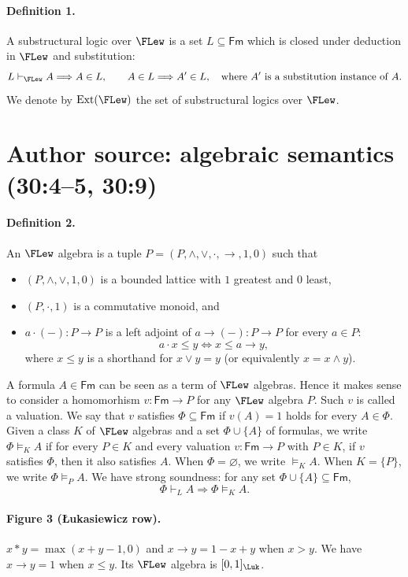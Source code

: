\paragraph{Definition 1.} A substructural logic over $\FLew$ is a set $L\subseteq\mathsf{Fm}$ which is closed under deduction in $\FLew$ and substitution:
\[
 L\vdash_{\FLew}A\Longrightarrow A\in L,\qquad
 A\in L\Longrightarrow A'\in L,\quad\text{where $A'$ is a substitution instance of $A$.}
\]
We denote by $\operatorname{Ext}(\FLew)$ the set of substructural logics over $\FLew$.
\section*{Author source: algebraic semantics (30:4--5, 30:9)}
\paragraph{Definition 2.} An $\FLew$ algebra is a tuple $P=(P,\wedge,\vee,\cdot,\to,1,0)$ such that
\begin{itemize}
\item $(P,\wedge,\vee,1,0)$ is a bounded lattice with $1$ greatest and $0$ least,
\item $(P,\cdot,1)$ is a commutative monoid, and
\item $a\cdot(-):P\to P$ is a left adjoint of $a\to(-):P\to P$ for every $a\in P$:
\[
 a\cdot x\le y\Longleftrightarrow x\le a\to y,
\]
where $x\le y$ is a shorthand for $x\vee y=y$ (or equivalently $x=x\wedge y$).
\end{itemize}
A formula $A\in\mathsf{Fm}$ can be seen as a term of $\FLew$ algebras. Hence it makes sense to consider a homomorhism $v:\mathsf{Fm}\to P$ for any $\FLew$ algebra $P$. Such $v$ is called a valuation. We say that $v$ satisfies $\Phi\subseteq\mathsf{Fm}$ if $v(A)=1$ holds for every $A\in\Phi$.
Given a class $K$ of $\FLew$ algebras and a set $\Phi\cup\{A\}$ of formulas, we write $\Phi\models_K A$ if for every $P\in K$ and every valuation $v:\mathsf{Fm}\to P$ with $P\in K$, if $v$ satisfies $\Phi$, then it also satisfies $A$. When $\Phi=\varnothing$, we write $\models_K A$. When $K=\{P\}$, we write $\Phi\models_P A$.
We have strong soundness: for any set $\Phi\cup\{A\}\subseteq\mathsf{Fm}$,
\[
 \Phi\vdash_L A\Longrightarrow\Phi\models_K A.
\]
\paragraph{Figure 3 (Łukasiewicz row).} $x*y=\max(x+y-1,0)$ and $x\to y=1-x+y$ when $x>y$. We have $x\to y=1$ when $x\le y$. Its $\FLew$ algebra is $[0,1]_{\Luk}$.
